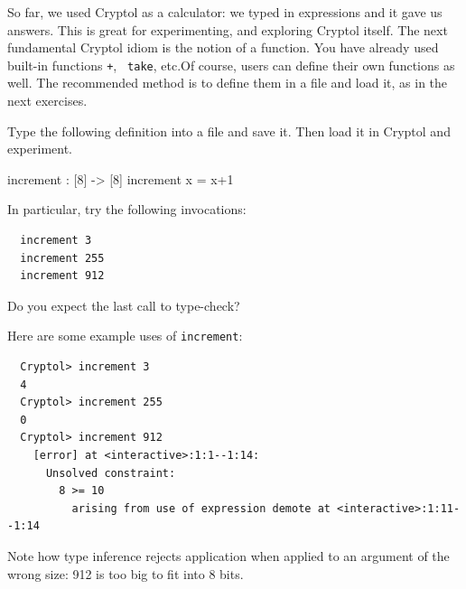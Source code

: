 So far, we used Cryptol as a calculator: we typed in expressions and
it gave us answers. This is great for experimenting, and exploring
Cryptol itself. The next fundamental Cryptol idiom is the notion of a
function. You have already used built-in functions {\tt +}, {\tt
  take}, etc.{\indPlus\indLg}Of course, users can define their own
functions as well. The recommended method is to define them in a file
and load it, as in the next exercises.


\begin{Exercise}\label{ex:fn:0}
  Type the following definition into a file and save it. Then load it
  in Cryptol and experiment.
\begin{code}
  increment : [8] -> [8]
  increment x = x+1
\end{code}
In particular, try the following invocations:
\begin{Verbatim}
  increment 3
  increment 255
  increment 912
\end{Verbatim}
Do you expect the last call to type-check?
\end{Exercise}
\begin{Answer}
Here are some example uses of {\tt increment}:
\begin{Verbatim}
  Cryptol> increment 3
  4
  Cryptol> increment 255
  0
  Cryptol> increment 912
    [error] at <interactive>:1:1--1:14:
      Unsolved constraint:
        8 >= 10
          arising from use of expression demote at <interactive>:1:11--1:14
\end{Verbatim}
Note how type inference rejects application when applied to an
argument of the wrong size: 912 is too big to fit into 8 bits.
\end{Answer}

\indFunApp

